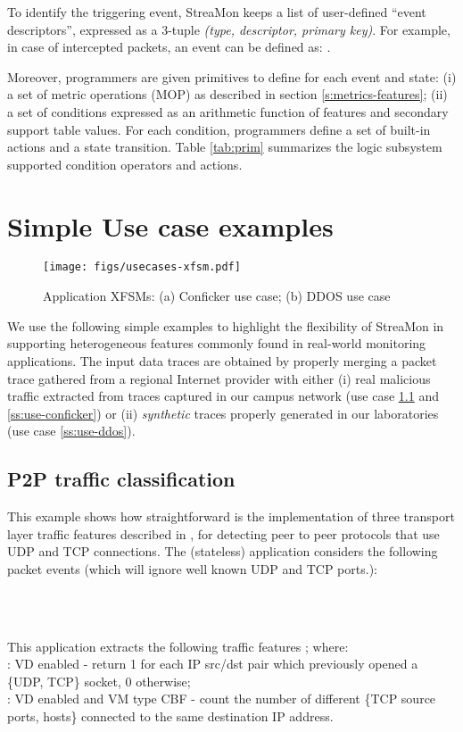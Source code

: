 \documentclass[conference,letterpaper]{sig-alternate-10pt}
\begin{document}
To identify the triggering event, StreaMon keeps a list of user-defined ``event descriptors'', expressed as a 3-tuple \textit{(type, descriptor, primary key)}. For example, in case of intercepted packets, an event can be defined as: .

Moreover, programmers are given primitives to define for each event and state: (i) a set of metric operations (MOP) as described in section \ref{s:metrics-features}; (ii) a set of conditions expressed as an arithmetic function of features and secondary support table values. For each condition, programmers define a set of built-in actions and a state transition. Table \ref{tab:prim} summarizes the logic subsystem supported condition operators and actions.

\section{Simple Use case examples}
\label{ss:usecases} 

\begin{figure*}[t]
	\centering
	\texttt{[image: figs/usecases-xfsm.pdf]}
	\caption{Application XFSMs: (a) Conficker use case; (b) DDOS use case}
	\label{fig:xfsms}
\end{figure*}

We use the following simple examples to highlight the flexibility of StreaMon in supporting heterogeneous features commonly found in real-world monitoring applications. The input data traces are obtained by properly merging a packet trace gathered from a regional Internet provider with either (i) real malicious traffic extracted from traces captured in our campus network (use case \ref{ss:use-p2p} and \ref{ss:use-conficker}) or (ii) \emph{synthetic} traces properly generated in our laboratories (use case \ref{ss:use-ddos}). 

\subsection{P2P traffic classification}
\label{ss:use-p2p}
This example shows how straightforward is the implementation of three transport layer traffic features described in \cite{kar04}, for detecting peer to peer protocols that use UDP and TCP connections. The (stateless) application considers the following packet events (which will ignore well known UDP and TCP ports.):\\
\begin{footnotesize}
 \\
 \\
\end{footnotesize}
This application extracts the following traffic features ;  where:\\
: VD enabled - return 1 for each IP src/dst pair which previously opened a \{UDP, TCP\} socket, 0 otherwise;\\
: VD enabled and VM type CBF - count the number of different \{TCP source ports,  hosts\} connected to the same destination IP address.
\end{document}
